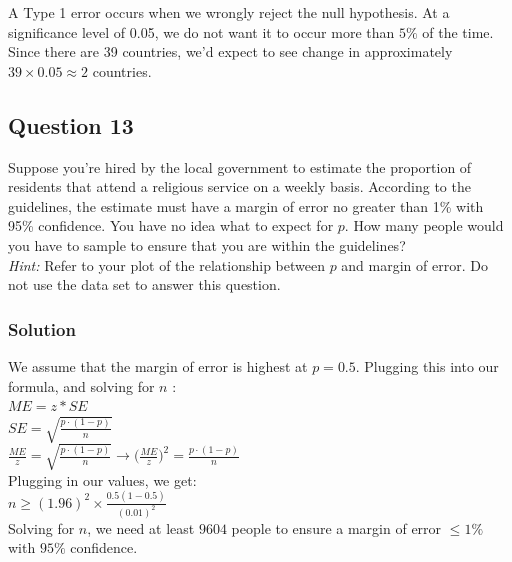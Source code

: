 \documentclass[]{article}
\begin{document}
A Type 1 error occurs when we wrongly reject the null hypothesis. At a
significance level of 0.05, we do not want it to occur more than \(5\%\)
of the time. Since there are 39 countries, we'd expect to see change in
approximately \(39 \times 0.05 \approx 2\) countries.

\subsection{Question 13}\label{question-13}

Suppose you're hired by the local government to estimate the proportion
of residents that attend a religious service on a weekly basis.
According to the guidelines, the estimate must have a margin of error no
greater than 1\% with 95\% confidence. You have no idea what to expect
for \(p\). How many people would you have to sample to ensure that you
are within the guidelines?\\
\emph{Hint:} Refer to your plot of the relationship between \(p\) and
margin of error. Do not use the data set to answer this question.

\subsubsection{Solution}\label{solution-14}

We assume that the margin of error is highest at \(p = 0.5\). Plugging
this into our formula, and solving for \(n\) :\\
\(ME = z * SE\)\\
\(SE = \sqrt{\frac{p\cdot(1-p)}{n}}\)\\
\(\frac{ME}{z} = \sqrt{\frac{p\cdot(1-p)}{n}} \to \Big(\frac{ME}{z}\Big)^2 = \frac{p\cdot(1-p)}{n}\)\\
Plugging in our values, we get:\\
\(n \geq (1.96)^2\times\frac{0.5(1-0.5)}{(0.01)^2}\)\\
Solving for \(n\), we need at least \(9604\) people to ensure a margin
of error \(\leq 1\%\) with \(95\%\) confidence.
\end{document}
